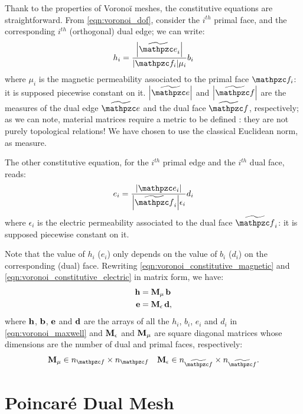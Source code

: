 Thank to the properties of Vorono\"i meshes, the constitutive
equations are straightforward. From \eqref{eqn:voronoi_dof}, consider
the $i^{th}$ primal face, and the corresponding $i^{th}$ (orthogonal) dual edge; we
can write:
\begin{equation} \label{eqn:voronoi_constitutive_magnetic}
  h_i = \frac{\Measure{\DualLine{e}_i}}{\Measure{\Surface{f}_i} \mu_i} b_i
\end{equation}
where $\mu_i$ is the magnetic permeability associated to the primal
face $\Surface{f}_i$: it is supposed piecewise constant on
it. $\Measure{\DualLine{e}}$ and $\Measure{\DualSurface{f}}$ are the
measures of the dual edge $\DualLine{e}$ and the dual face
$\DualSurface{f}$, respectively; as we can note, material matrices
require a metric to be defined \cite{bossavit_computational}: they are
not purely topological relations! We have chosen to use the classical
Euclidean norm, as measure.

The other constitutive equation, for the $i^{th}$ primal edge and the
$i^{th}$ dual face, reads:
\begin{equation} \label{eqn:voronoi_constitutive_electric}
  e_i = \frac{\Measure{\Line{e}_i}}{\Measure{\DualSurface{f}_i} \epsilon_i} d_i
\end{equation}
where $\epsilon_i$ is the electric permeability associated to the dual
face $\DualSurface{f}_i$: it is supposed piecewise constant on it.

Note that the value of $h_i$ ($e_i$) only depends on the value of
$b_i$ ($d_i$) on the corresponding (dual) face. Rewriting
\eqref{eqn:voronoi_constitutive_magnetic} and
\eqref{eqn:voronoi_constitutive_electric} in matrix form, we have:
\begin{align*}
  \mathbf{h} & = {\mathbf{M}_\mu\,\mathbf{b}} \\
  \mathbf{e} & = {\mathbf{M}_\epsilon\,\mathbf{d}} ,
\end{align*}
where $\mathbf{h}$, $\mathbf{b}$, $\mathbf{e}$ and $\mathbf{d}$ are the arrays of all the $h_i$,
$b_i$, $e_i$ and $d_i$ in \eqref{eqn:voronoi_maxwell} and $\mathbf{M}_\epsilon$ and
$\mathbf{M}_\mu$ are square diagonal matrices whose dimensions are the number
of dual and primal faces, respectively:
\begin{align*}
  \Matrix{M}_\mu \in \nf \times \nf && \Matrix{M}_\epsilon \in \ndf \times \ndf .
\end{align*}


\section{Poincar\'e Dual Mesh}  \label{sec:poicare}

